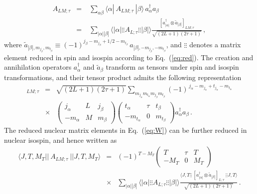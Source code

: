 \documentclass[11pt,a4paper]{article}
\begin{document}
\begin{eqnarray}
  A_{LM;\tau} &=&\;  \sum_{\alpha\beta}\langle \alpha|~A_{LM;\tau}~|\beta\rangle \,a_{\alpha}^{\dagger}a_{\beta} \nonumber\\
&=&\; \sum_{|\alpha||\beta|}\langle\left|\alpha\right|\vdots\vdots A_{L;\tau}\vdots\vdots \left|\beta\right|\rangle\frac{[a_{|\alpha|}^{\dagger}\otimes\tilde{a}_{|\beta|}]_{LM;\tau}}{\sqrt{(2L+1)(2\tau+1)}} \,,
\label{eq:keyeq}
\end{eqnarray}  
where $\tilde{a}_{|\beta|,m_{j_\beta},m_{t_{\beta}}}\equiv (-1)^{j_\beta-m_{j_\beta}+1/2-m_{t_\beta}}\,a_{|\beta|,-m_{j_\beta},-m_{t_{\beta}}}$, and $\vdots\vdots$ denotes a matrix element reduced in spin and isospin according to Eq.~(\ref{eq:red}). The creation and annihilation operators $a^{\dagger}_{\alpha}$ and $\tilde{a}_\beta$ transform as tensors under spin and isospin transformations, and their tensor product admits  the following representation 
\begin{eqnarray}
[a_{|\alpha|}^{\dagger}\otimes\tilde{a}_{|\beta|}]_{LM;\tau} &=&  \sqrt{(2L+1)(2\tau+1)}\sum_{m_{j_\alpha}m_{t_{\alpha}}m_{j_\beta}m_{t_{\beta}}}(-1)^{\,j_{\alpha}-m_{j_\alpha}+t_{j_\alpha}-m_{t_{\alpha}}}\nonumber\\
&\times&\begin{pmatrix}
    j_{\alpha}&L&j_{\beta}\\
    -m_{\alpha}&M&m_{\beta}
  \end{pmatrix}\begin{pmatrix}
    t_{\alpha}&\tau&t_{\beta}\\
    -m_{t_{\alpha}}&0&m_{t_{\beta}}
  \end{pmatrix}a_{\alpha}^{\dagger}a_{\beta}
\,.
\end{eqnarray}
The reduced nuclear matrix elements in Eq.~(\ref{eq:W}) can be further reduced in nuclear isospin, and hence written as 
\begin{eqnarray}
\langle J, T, M_T  ||~ A_{LM;\tau} ~ || J, T, M_T \rangle &=& (-1)^{T-M_T}
\begin{pmatrix}
    T&\tau&T\\
    -M_T&0&M_T
  \end{pmatrix} \nonumber\\
&\times& \sum_{|\alpha||\beta|}\langle\left|\alpha\right|\vdots\vdots A_{L;\tau}\vdots\vdots \left|\beta\right|\rangle\frac{\langle J, T \vdots\vdots ~[a_{|\alpha|}^{\dagger}\otimes\tilde{a}_{|\beta|}]_{L;\tau}
~\vdots\vdots J, T\rangle}{\sqrt{(2L+1)(2\tau+1)}} \,.\nonumber\\
\end{eqnarray}
\end{document}
